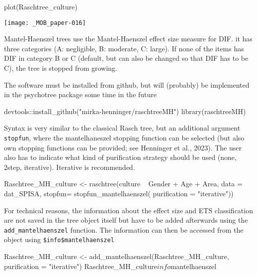 \documentclass[doc,floatsintext,natbib]{apa7}
\begin{document}
\begin{Schunk}
\begin{Sinput}
 plot(Raschtree_culture)
\end{Sinput}
\end{Schunk}
\texttt{[image: \_MOB\_paper-016]}

Mantel-Haenszel trees use the Mantel-Haenszel effect size measure for DIF. it has three categories (A: negligible, B: moderate, C: large). If none of the items has DIF in category B or C (default, but can also be changed so that DIF has to be C), the tree is stopped from growing. 

The software must be installed from github, but will (probably) be implemented in the psychotree package some time in the future

\begin{Schunk}
\begin{Sinput}
 devtools::install_github("mirka-henninger/raschtreeMH")
 library(raschtreeMH)
\end{Sinput}
\end{Schunk}

Syntax is very similar to the classical Rasch tree, but an additional argument \texttt{stopfun}, where the mantelhaneszel stopping function can be selected (but also own stopping functions can be provided; see Henninger et al., 2023). The user also has to indicate what kind of purification strategy should be used (none, 2step, iterative). Iterative is recommended. 


\begin{Schunk}
\begin{Sinput}
 Raschtree_MH_culture <- raschtree(culture ~  Gender + Age + Area, 
                                   data = dat_SPISA, 
                                   stopfun= stopfun_mantelhaenszel(
                                     purification = "iterative"))
\end{Sinput}
\end{Schunk}

For technical reasons, the information about the effect size and ETS classification are not saved in the tree object itself but have to be added afterwards using the \texttt{add\_mantelhaenszel} function. The information can then be accessed from the object using \texttt{\$info\$mantelhaenszel}

\begin{Schunk}
\begin{Sinput}
 Raschtree_MH_culture <- add_mantelhaenszel(Raschtree_MH_culture, 
                                            purification = "iterative")
 Raschtree_MH_culture$info$mantelhaenszel
\end{Sinput}
\end{Schunk}
\end{document}
